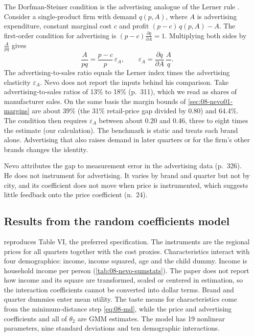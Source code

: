 The Dorfman-Steiner condition is the advertising analogue of the Lerner rule \citep{DorfmanSteiner1954}. Consider a single-product firm with
demand $q(p, A)$, where $A$ is advertising expenditure, constant marginal cost $c$ and profit $(p - c)\,q(p, A) -
A$. The first-order condition for advertising is $(p - c)\frac{\partial q}{\partial A} = 1$. Multiplying both
sides by $\frac{A}{pq}$ gives
\begin{equation*}
  \frac{A}{pq} = \frac{p - c}{p}\,\varepsilon_A, \qquad \varepsilon_A = \frac{\partial q}{\partial A}\,\frac{A}{q}.
\end{equation*}
The advertising-to-sales ratio equals the Lerner index times the advertising elasticity $\varepsilon_A$. Nevo
does not report the inputs behind his comparison. Take advertising-to-sales ratios of 13\% to 18\% (p.~311), which we read as
shares of manufacturer sales. On the same basis the margin bounds of \cref{sec:08-nevo01-margins} are about
39\% (the 31\% retail-price gap divided by 0.80) and 64.4\%. The condition then requires $\varepsilon_A$
between about 0.20 and 0.46, three to eight times the estimate (our calculation). The
benchmark is static and treats each brand alone. Advertising that also raises demand in later quarters or for
the firm's other brands changes the identity.

Nevo attributes the gap to measurement error in the advertising data (p.~326). He does not instrument for
advertising. It varies by brand
and quarter but not by city, and its coefficient does not move when price is instrumented, which suggests
little feedback onto the price coefficient (n.~24).

\subsection{Results from the random coefficients model}\label{sec:08-nevo01-full}

 reproduces Table VI, the preferred specification. The instruments are the regional
prices for all quarters together with the cost proxies. Characteristics interact with four demographics:
income, income squared, age and the child dummy. Income is household income per person
(\cref{tab:08-nevo-sumstats}). The paper does not report how income and its square are transformed, scaled or
centered in estimation, so the interaction coefficients cannot be converted into dollar terms. Brand and
quarter dummies enter mean utility. The taste means
for characteristics come from the minimum-distance step \eqref{eq:08-md}, while the price and advertising
coefficients and all of $\theta_2$ are GMM estimates. The model has 19 nonlinear parameters, nine standard
deviations and ten demographic interactions.

